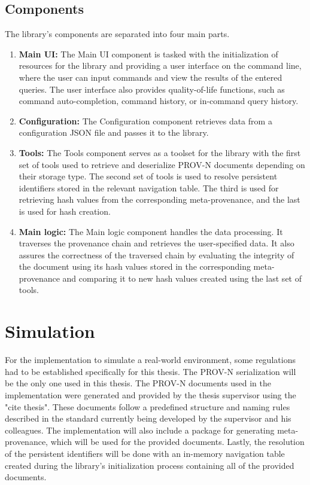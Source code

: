 \documentclass[
  digital,     %
  oneside,     %
  nosansbold,  %
  nocolorbold, %
  lof,         %
  lot,         %
]{fithesis4}
\begin{document}
\subsection{Components}
\shorthandoff{-}
The library's components are separated into four main parts.
\begin{enumerate}
    \item \textbf{Main UI:}
        The Main UI component is tasked with the initialization of resources for the library and providing a user interface on the command line, where the user can input commands and view the results of the entered queries. The user interface also provides quality-of-life functions, such as command auto-completion, command history, or in-command query history.
    \item \textbf{Configuration:}
        The Configuration component retrieves data from a configuration JSON file and passes it to the library.
    \item \textbf{Tools:}
        The Tools component serves as a toolset for the library with the first set of tools used to retrieve and deserialize PROV-N documents depending on their storage type. 
        The second set of tools is used to resolve persistent identifiers stored in the relevant navigation table.
        The third is used for retrieving hash values from the corresponding meta-provenance, and the last is used for hash creation.
    \item \textbf{Main logic:}
        The Main logic component handles the data processing. It traverses the provenance chain and retrieves the user-specified data. It also assures the correctness of the traversed chain by evaluating the integrity of the document using its hash values stored in the corresponding meta-provenance and comparing it to new hash values created using the last set of tools.
\end{enumerate}
\shorthandon{-}

\section{Simulation}
\shorthandoff{-}
For the implementation to simulate a real-world environment, some regulations had to be established specifically for this thesis. The PROV-N serialization will be the only one used in this thesis. The PROV-N documents used in the implementation were generated and provided by the thesis supervisor using the "cite thesis". These documents follow a predefined structure and naming rules described in the standard currently being developed by the supervisor and his colleagues. The implementation will also include a package for generating meta-provenance, which will be used for the provided documents. Lastly, the resolution of the persistent identifiers will be done with an in-memory navigation table created during the library's initialization process containing all of the provided documents.
\shorthandon{-}
\end{document}
